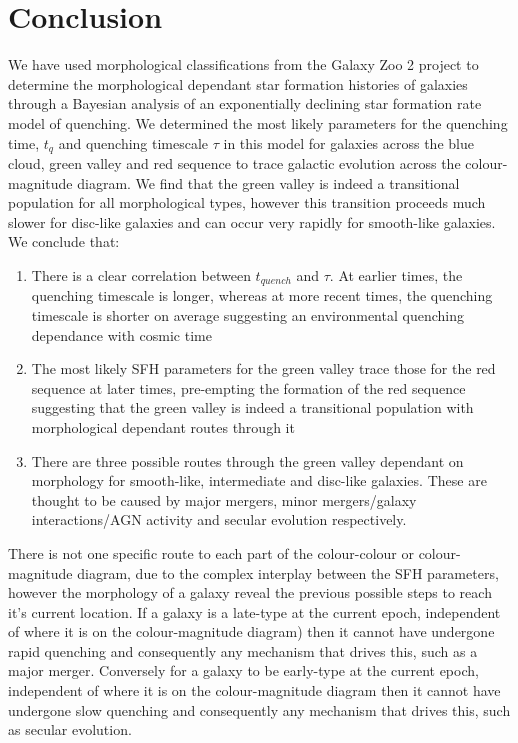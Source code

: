 \documentclass{mn2e}
\begin{document}
\section{Conclusion}\label{conc}
We have used morphological classifications from the Galaxy Zoo 2 project to determine the morphological dependant star formation histories of galaxies through a Bayesian analysis of an exponentially declining star formation rate model of quenching. We determined the most likely parameters for the quenching time, $t_q$ and quenching timescale $\tau$ in this model for galaxies across the blue cloud, green valley and red sequence to trace galactic evolution across the colour-magnitude diagram. We find that the green valley is indeed a transitional population for all morphological types, however this transition proceeds much slower for disc-like galaxies and can occur very rapidly for smooth-like galaxies. We conclude that:
\begin{enumerate}
\item There is a clear correlation between $t_{quench}$ and $\tau$. At earlier times, the quenching timescale is longer, whereas at more recent times, the quenching timescale is shorter on average suggesting an environmental quenching dependance with cosmic time
\item The most likely SFH parameters for the green valley trace those for the red sequence at later times, pre-empting the formation of the red sequence suggesting that the green valley is indeed a transitional population with morphological dependant routes through it
\item There are three possible routes through the green valley dependant on morphology for smooth-like, intermediate and disc-like galaxies. These are thought to be caused by major mergers, minor mergers/galaxy interactions/AGN activity and secular evolution respectively.
\end{enumerate}

There is not one specific route to each part of the colour-colour or colour-magnitude diagram, due to the complex interplay between the SFH parameters, however the morphology of a galaxy reveal the previous possible steps to reach it's current location. If a galaxy is a late-type at the current epoch, independent of where it is on the colour-magnitude diagram) then it cannot have undergone rapid quenching and consequently any mechanism that drives this, such as a major merger. Conversely for a galaxy to be early-type at the current epoch, independent of where it is on the colour-magnitude diagram then it cannot have undergone slow quenching and consequently any mechanism that drives this, such as secular evolution. 
\end{document}
